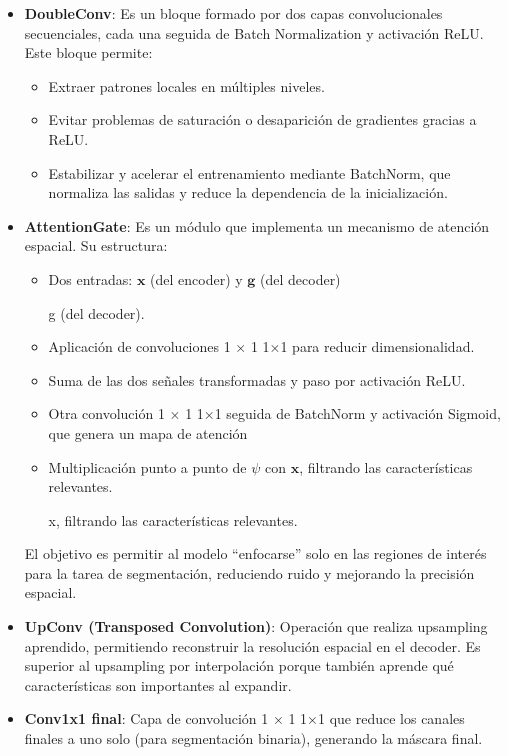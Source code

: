 \begin{itemize}
\item \textbf{DoubleConv}:
Es un bloque formado por dos capas convolucionales secuenciales, cada una seguida de Batch Normalization y activación ReLU.
Este bloque permite:
\begin{itemize}
\item Extraer patrones locales en múltiples niveles.
\item Evitar problemas de saturación o desaparición de gradientes gracias a ReLU.
\item Estabilizar y acelerar el entrenamiento mediante BatchNorm, que normaliza las salidas y reduce la dependencia de la inicialización.
\end{itemize}

\item \textbf{AttentionGate}:
Es un módulo que implementa un mecanismo de atención espacial. Su estructura:
\begin{itemize}
\item Dos entradas: 
$\mathbf{x}$ (del encoder) y $\mathbf{g}$ (del decoder)

g (del decoder).
\item Aplicación de convoluciones 
1
×
1
1×1 para reducir dimensionalidad.
\item Suma de las dos señales transformadas y paso por activación ReLU.
\item Otra convolución 
1
×
1
1×1 seguida de BatchNorm y activación Sigmoid, que genera un mapa de atención 
\item Multiplicación punto a punto de $\psi$ con $\mathbf{x}$, filtrando las características relevantes.

x, filtrando las características relevantes.
\end{itemize}
El objetivo es permitir al modelo “enfocarse” solo en las regiones de interés para la tarea de segmentación, reduciendo ruido y mejorando la precisión espacial.

\item \textbf{UpConv (Transposed Convolution)}:
Operación que realiza upsampling aprendido, permitiendo reconstruir la resolución espacial en el decoder. Es superior al upsampling por interpolación porque también aprende qué características son importantes al expandir.

\item \textbf{Conv1x1 final}:
Capa de convolución 
1
×
1
1×1 que reduce los canales finales a uno solo (para segmentación binaria), generando la máscara final.
\end{itemize}

